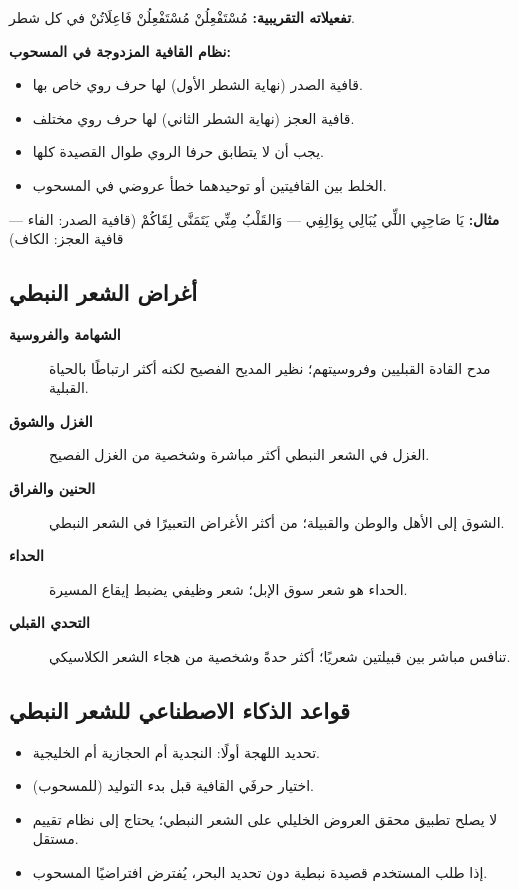 \begin{otherlanguage}{arabic}
\textbf{تفعيلاته التقريبية:} مُسْتَفْعِلُنْ مُسْتَفْعِلُنْ فَاعِلَاتُنْ في كل شطر.

\textbf{نظام القافية المزدوجة في المسحوب:}
\begin{itemize}
  \item قافية الصدر (نهاية الشطر الأول) لها حرف روي خاص بها.
  \item قافية العجز (نهاية الشطر الثاني) لها حرف روي مختلف.
  \item يجب أن لا يتطابق حرفا الروي طوال القصيدة كلها.
  \item الخلط بين القافيتين أو توحيدهما خطأ عروضي في المسحوب.
\end{itemize}

\textbf{مثال:} يَا صَاحِبِي اللِّي يُبَالِي بِوَالِفِي --- وَالقَلْبُ مِنِّي يَتَمَنَّى لِقَاكُمْ
(قافية الصدر: الفاء --- قافية العجز: الكاف)

\subsection*{أغراض الشعر النبطي}

\begin{description}
  \item[\textbf{الشهامة والفروسية}] مدح القادة القبليين وفروسيتهم؛ نظير المديح الفصيح لكنه أكثر ارتباطًا بالحياة القبلية.
  \item[\textbf{الغزل والشوق}] الغزل في الشعر النبطي أكثر مباشرة وشخصية من الغزل الفصيح.
  \item[\textbf{الحنين والفراق}] الشوق إلى الأهل والوطن والقبيلة؛ من أكثر الأغراض التعبيرًا في الشعر النبطي.
  \item[\textbf{الحداء}] الحداء هو شعر سوق الإبل؛ شعر وظيفي يضبط إيقاع المسيرة.
  \item[\textbf{التحدي القبلي}] تنافس مباشر بين قبيلتين شعريًا؛ أكثر حدةً وشخصية من هجاء الشعر الكلاسيكي.
\end{description}

\subsection*{قواعد الذكاء الاصطناعي للشعر النبطي}

\begin{itemize}
  \item تحديد اللهجة أولًا: النجدية أم الحجازية أم الخليجية.
  \item اختيار حرفَي القافية قبل بدء التوليد (للمسحوب).
  \item لا يصلح تطبيق محقق العروض الخليلي على الشعر النبطي؛ يحتاج إلى نظام تقييم مستقل.
  \item إذا طلب المستخدم قصيدة نبطية دون تحديد البحر، يُفترض افتراضيًا المسحوب.
\end{itemize}

\end{otherlanguage}
